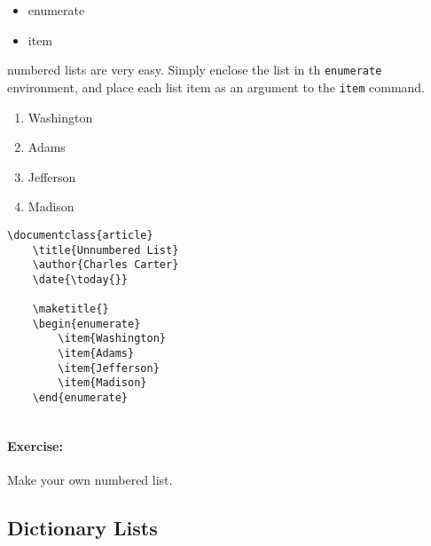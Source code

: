         \begin{framed}
            \begin{itemize}
                \item{enumerate}
                \item{item}
            \end{itemize}
        \end{framed}

        \Lx{} numbered lists are very easy. Simply enclose the list in th \texttt{enumerate} environment, and place each list item as an argument to the \texttt{item} command.

    \begin{enumerate}
    \label{lists:enumerate}
        \item{Washington}
        \item{Adams}
        \item{Jefferson}
        \item{Madison}
    \end{enumerate}

        \begin{verbatim}
\documentclass{article}
    \title{Unnumbered List}
    \author{Charles Carter}
    \date{\today{}}
 
    \maketitle{}
    \begin{enumerate}
        \item{Washington}
        \item{Adams}
        \item{Jefferson}
        \item{Madison}
    \end{enumerate}
    
        \end{verbatim}

        \paragraph{Exercise:} Make your own numbered list.

        \subsection{Dictionary Lists}
        \label{Dictionary Lists}
        
